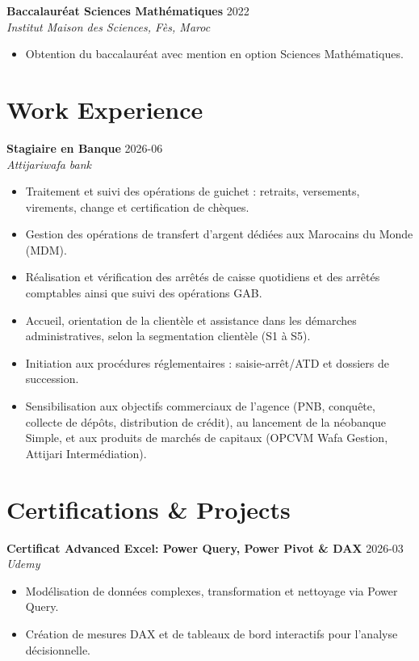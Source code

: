 \documentclass[10pt,a4paper]{article}
\begin{document}
\vspace{4pt}

\textbf{Baccalauréat Sciences Mathématiques} \hfill 2022 \\
\textit{Institut Maison des Sciences, Fès, Maroc}
\begin{itemize}
    \item Obtention du baccalauréat avec mention en option Sciences Mathématiques.
\end{itemize}

\section*{Work Experience}

\textbf{Stagiaire en Banque} \hfill 2026-06 \\
\textit{Attijariwafa bank}
\begin{itemize}
    \item Traitement et suivi des opérations de guichet : retraits, versements, virements, change et certification de chèques.
    \item Gestion des opérations de transfert d'argent dédiées aux Marocains du Monde (MDM).
    \item Réalisation et vérification des arrêtés de caisse quotidiens et des arrêtés comptables ainsi que suivi des opérations GAB.
    \item Accueil, orientation de la clientèle et assistance dans les démarches administratives, selon la segmentation clientèle (S1 à S5).
    \item Initiation aux procédures réglementaires : saisie-arrêt/ATD et dossiers de succession.
    \item Sensibilisation aux objectifs commerciaux de l'agence (PNB, conquête, collecte de dépôts, distribution de crédit), au lancement de la néobanque Simple, et aux produits de marchés de capitaux (OPCVM Wafa Gestion, Attijari Intermédiation).
\end{itemize}

\section*{Certifications \& Projects}

\textbf{Certificat Advanced Excel: Power Query, Power Pivot \& DAX} \hfill 2026-03 \\
\textit{Udemy}
\begin{itemize}
    \item Modélisation de données complexes, transformation et nettoyage via Power Query.
    \item Création de mesures DAX et de tableaux de bord interactifs pour l'analyse décisionnelle.
\end{itemize}
\end{document}
